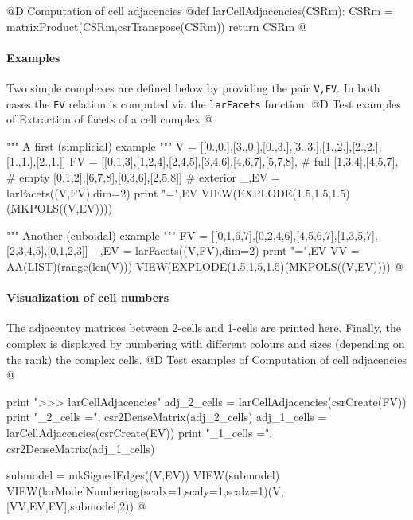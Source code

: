 \documentclass[11pt,oneside]{article}	%
\begin{document}
@D Computation of cell adjacencies
@{def larCellAdjacencies(CSRm):
	CSRm = matrixProduct(CSRm,csrTranspose(CSRm))
	return CSRm
@}

\paragraph{Examples}
Two simple complexes are defined below by providing the pair \texttt{V,FV}.
In both cases the \texttt{EV} relation is computed via the \texttt{larFacets} function.
@D Test examples of Extraction of facets of a cell complex
@{""" A first (simplicial) example """
V = [[0.,0.],[3.,0.],[0.,3.],[3.,3.],[1.,2.],[2.,2.],[1.,1.],[2.,1.]]
FV = [[0,1,3],[1,2,4],[2,4,5],[3,4,6],[4,6,7],[5,7,8], # full
	[1,3,4],[4,5,7], # empty
	[0,1,2],[6,7,8],[0,3,6],[2,5,8]] # exterior		
_,EV = larFacets((V,FV),dim=2)
print "\nEV =",EV
VIEW(EXPLODE(1.5,1.5,1.5)(MKPOLS((V,EV))))

""" Another (cuboidal) example """
FV = [[0,1,6,7],[0,2,4,6],[4,5,6,7],[1,3,5,7],[2,3,4,5],[0,1,2,3]]
_,EV = larFacets((V,FV),dim=2)
print "\nEV =",EV
VV = AA(LIST)(range(len(V)))
VIEW(EXPLODE(1.5,1.5,1.5)(MKPOLS((V,EV))))
@}

\paragraph{Visualization of cell numbers}
The adjacentcy matrices between 2-cells and 1-cells are printed here. Finally, the complex is displayed by numbering with different colours and sizes (depending on the rank) the complex cells.
@D Test examples of Computation of cell adjacencies
@{
print "\n>>> larCellAdjacencies"
adj_2_cells = larCellAdjacencies(csrCreate(FV))
print "\nadj_2_cells =\n", csr2DenseMatrix(adj_2_cells)
adj_1_cells = larCellAdjacencies(csrCreate(EV))
print "\nadj_1_cells =\n", csr2DenseMatrix(adj_1_cells)

submodel = mkSignedEdges((V,EV))
VIEW(submodel)
VIEW(larModelNumbering(scalx=1,scaly=1,scalz=1)(V,[VV,EV,FV],submodel,2))
@}
\end{document}
